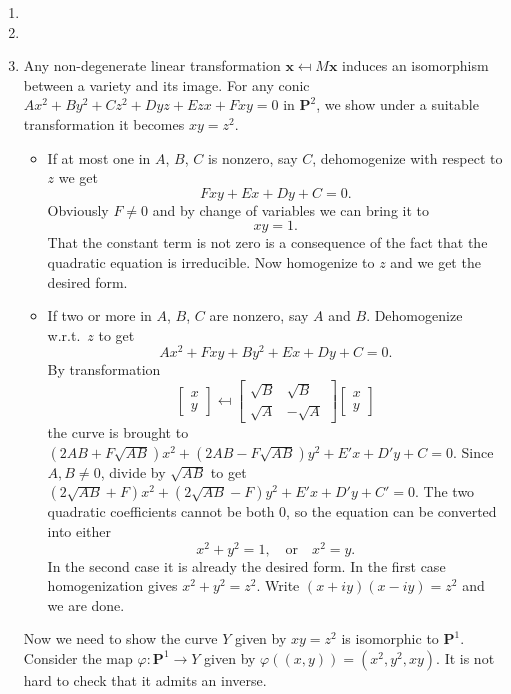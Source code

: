 \documentclass{note}
\newcommand{\Proj}[1]{\mathbf{P}^{#1}}
\begin{document}
\begin{enumerate}
\item
\item
\item Any non-degenerate linear transformation
  $\mathbf{x} \mapsfrom M\mathbf{x}$ induces an isomorphism between a
  variety and its image. For any conic
  $Ax^2 + By^2 + Cz^2 + Dyz + Ezx + Fxy = 0$ in $\Proj{2}$, we show
  under a suitable transformation it becomes $xy = z^2$.
  \begin{itemize}
  \item If at most one in $A$, $B$, $C$ is nonzero, say $C$,
    dehomogenize with respect to $z$ we get
    \begin{equation*}
      Fxy + Ex + Dy + C = 0.
    \end{equation*}
    Obviously $F \ne 0$ and by change of variables we can bring it to
    \begin{equation*}
      xy = 1.
    \end{equation*}
    That the constant term is not zero is a consequence of the fact
    that the quadratic equation is irreducible. Now homogenize to $z$
    and we get the desired form.
  \item If two or more in $A$, $B$, $C$ are nonzero, say $A$ and
    $B$. Dehomogenize w.r.t.~$z$ to get
    \begin{equation*}
      Ax^2 + Fxy + By^2 + Ex + Dy + C = 0.
    \end{equation*}
    By transformation
    \begin{equation*}
      \begin{bmatrix}
        x \\ y
      \end{bmatrix}
      \mapsfrom
      \begin{bmatrix}
        \sqrt{B} & \sqrt{B} \\
        \sqrt{A} & -\sqrt{A}
      \end{bmatrix}
      \begin{bmatrix}
        x \\ y
      \end{bmatrix}
    \end{equation*}
    the curve is brought to
    $(2AB + F\sqrt{AB})x^2 + (2AB - F\sqrt{AB})y^2 + E'x + D'y + C =
    0$. Since $A,B\ne0$, divide by $\sqrt{AB}$ to get
    $(2\sqrt{AB} + F)x^2 + (2\sqrt{AB} - F)y^2 + E'x + D'y + C' =
    0$. The two quadratic coefficients cannot be both 0, so the
    equation can be converted into either
    \begin{equation*}
      x^2 + y^2 = 1, \quad \text{or} \quad x^2 = y.
    \end{equation*}
    In the second case it is already the desired form. In the first
    case homogenization gives $x^2 + y^2 = z^2$. Write
    $(x + iy)(x - iy) = z^2$ and we are done.
  \end{itemize}
  Now we need to show the curve $Y$ given by $xy = z^2$ is isomorphic
  to $\Proj{1}$. Consider the map $\varphi\colon\Proj{1} \to Y$ given
  by $\varphi((x,y)) = (x^2,y^2,xy)$. It is not hard to check that it
  admits an inverse.
  

\end{enumerate}
\end{document}
